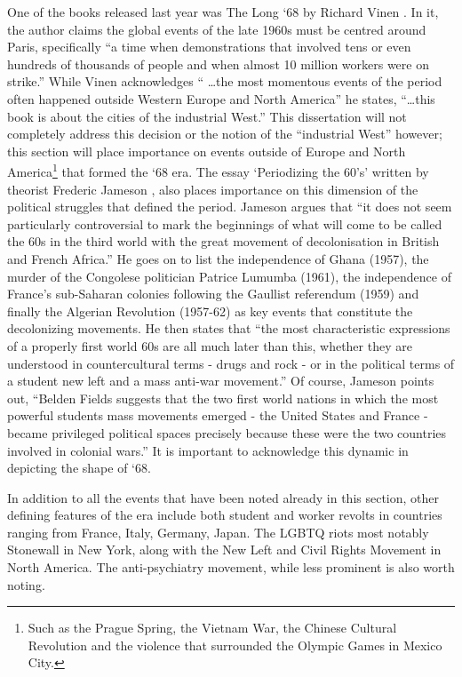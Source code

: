 \documentclass[12pt]{article}
\begin{document}
One of the books released last year was The Long `68 by Richard Vinen \citeyear{Vinen:2018aa}. In it, the author claims the global events of the late 1960s must be centred around Paris, specifically ``a time when demonstrations that involved tens or even hundreds of thousands of people and when almost 10 million workers were on strike.'' While Vinen acknowledges `` \dots the most momentous events of the period often happened outside Western Europe and North America'' he states, ``\dots this book is about the cities of the industrial West.'' This dissertation will not completely address this decision or the notion of the ``industrial West'' however; this section will place importance on events outside of Europe and North America\footnote{Such as the Prague Spring, the Vietnam War, the Chinese Cultural Revolution and the violence that surrounded the Olympic Games in Mexico City.} that formed the `68 era. The essay `Periodizing the 60's' written by theorist Frederic Jameson \citeyear{Jameson:1984aa}, also places importance on this dimension of the political struggles that defined the period. Jameson argues that ``it does not seem particularly controversial to mark the beginnings of what will come to be called the 60s in the third world with the great movement of decolonisation in British and French Africa.'' He goes on to list the independence of Ghana (1957), the murder of the Congolese politician Patrice Lumumba (1961), the independence of France's sub-Saharan colonies following the Gaullist referendum (1959) and finally the Algerian Revolution (1957-62) as key events that constitute the decolonizing movements. He then states that ``the most characteristic expressions of a properly first world 60s are all much later than this, whether they are understood in countercultural terms - drugs and rock - or in the political terms of a student new left and a mass anti-war movement.'' Of course, Jameson points out, ``Belden Fields suggests that the two first world nations in which the most powerful students mass movements emerged - the United States and France - became privileged political spaces precisely because these were the two countries involved in colonial wars.'' It is important to acknowledge this dynamic in depicting the shape of `68. 

In addition to all the events that have been noted already in this section, other defining features of the era include both student and worker revolts in countries ranging from France, Italy, Germany, Japan. The LGBTQ riots most notably Stonewall in New York, along with the New Left and Civil Rights Movement in North America. The anti-psychiatry movement, while less prominent is also worth noting. 
 
\end{document}
